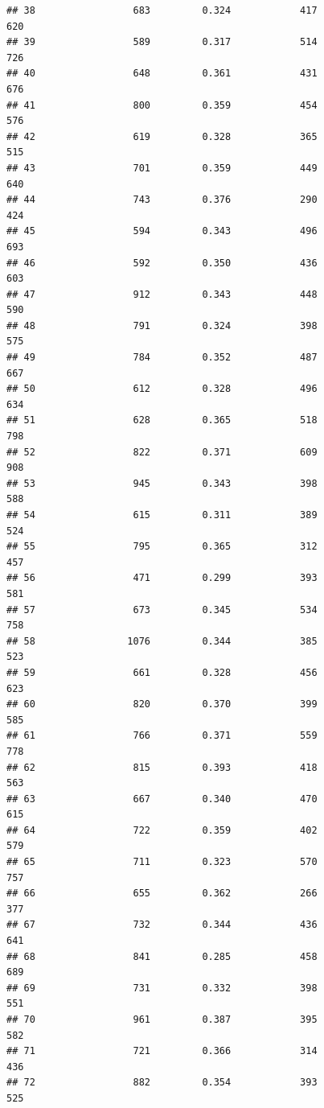 \documentclass[]{book}
\begin{document}
\begin{verbatim}
## 38                 683         0.324            417                 620
## 39                 589         0.317            514                 726
## 40                 648         0.361            431                 676
## 41                 800         0.359            454                 576
## 42                 619         0.328            365                 515
## 43                 701         0.359            449                 640
## 44                 743         0.376            290                 424
## 45                 594         0.343            496                 693
## 46                 592         0.350            436                 603
## 47                 912         0.343            448                 590
## 48                 791         0.324            398                 575
## 49                 784         0.352            487                 667
## 50                 612         0.328            496                 634
## 51                 628         0.365            518                 798
## 52                 822         0.371            609                 908
## 53                 945         0.343            398                 588
## 54                 615         0.311            389                 524
## 55                 795         0.365            312                 457
## 56                 471         0.299            393                 581
## 57                 673         0.345            534                 758
## 58                1076         0.344            385                 523
## 59                 661         0.328            456                 623
## 60                 820         0.370            399                 585
## 61                 766         0.371            559                 778
## 62                 815         0.393            418                 563
## 63                 667         0.340            470                 615
## 64                 722         0.359            402                 579
## 65                 711         0.323            570                 757
## 66                 655         0.362            266                 377
## 67                 732         0.344            436                 641
## 68                 841         0.285            458                 689
## 69                 731         0.332            398                 551
## 70                 961         0.387            395                 582
## 71                 721         0.366            314                 436
## 72                 882         0.354            393                 525

\end{verbatim}
\end{document}
